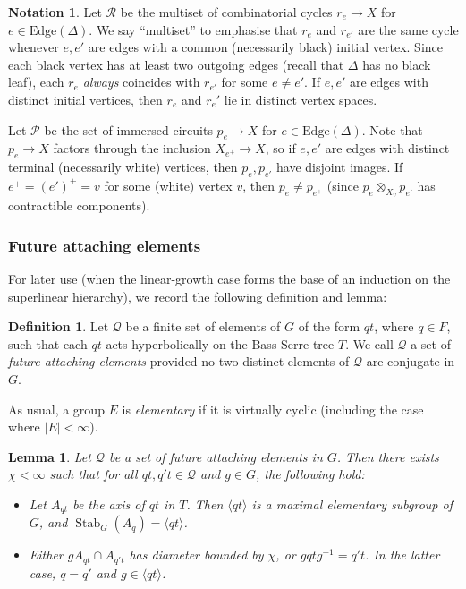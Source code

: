 \documentclass[11pt,oneside]{amsart}
\newcounter{ax}
\newtheorem{lem}[thm]{Lemma}
\theoremstyle{definition}
\newtheorem{defn}[thm]{Definition}
\newtheorem{notation}[thm]{Notation}
\DeclareMathOperator{\stabilizer}{Stab}
\newcommand{\edges}{\mathrm{Edge}}
\begin{document}
\begin{notation}\label{notation:P-R}
Let $\mathcal R$ be the multiset of combinatorial cycles $r_e\to X$ for $e\in\edges(\Delta)$.  We say ``multiset'' to emphasise that $r_e$ and $r_{e'}$ are the same cycle whenever $e,e'$ are edges with a common (necessarily black) initial vertex.  Since each black vertex has at least two outgoing edges (recall that $\Delta$ has no black leaf), each $r_e$ \emph{always} coincides with $r_{e'}$ for some $e\neq e'$. If $e,e'$ are edges with distinct initial vertices, then $r_e$ and $r_e'$ lie in distinct vertex spaces.

Let $\mathcal P$ be the set of immersed circuits $p_e\to X$ for $e\in\edges(\Delta)$.  Note that $p_e\to X$ factors through the inclusion $X_{e^+}\to X$, so if $e,e'$ are edges with distinct terminal (necessarily white) vertices, then $p_e,p_{e'}$ have disjoint images.  If $e^+=(e')^+=v$ for some (white) vertex $v$, then $p_e\neq p_{e^+}$ (since $p_{e}\otimes_{X_v}p_{e'}$ has contractible components).
\end{notation}

    


\subsubsection{Future attaching elements}\label{subsec:future-attaching}
For later use (when the linear-growth case forms the base of an induction on the superlinear hierarchy), we record the following definition and lemma:

\begin{defn}\label{defn:linear-hyperbolics}
Let $\mathcal Q$ be a finite set of elements of $G$ of the form $qt$, where $q\in F$, such that each $qt$ acts hyperbolically on the Bass-Serre tree $T$.  We call $\mathcal Q$ a set of \emph{future attaching elements} provided no two distinct elements of $\mathcal Q$ are conjugate in $G$.
\end{defn}

As usual, a group $E$ is \emph{elementary} if it is virtually cyclic (including the case where $|E|<\infty$).

\begin{lem}\label{lem:future-attaching-acyl}
Let $\mathcal Q$ be a set of future attaching elements in $G$.  Then there exists $\chi<\infty$ such that for all $qt,q't\in\mathcal Q$ and $g\in G$, the following hold:
\begin{itemize}
    \item Let $A_{qt}$ be the axis of $qt$ in $T$.  Then $\langle qt\rangle$ is a maximal elementary subgroup of $G$, and $\stabilizer_G(A_q)=\langle qt\rangle$.
    \item   Either $gA_{qt}\cap A_{q't}$ has diameter bounded by $\chi$, or $gqtg^{-1}=q't$.  In the latter case, $q=q'$ and $g\in\langle qt\rangle$.
\end{itemize}
\end{lem}
\end{document}
